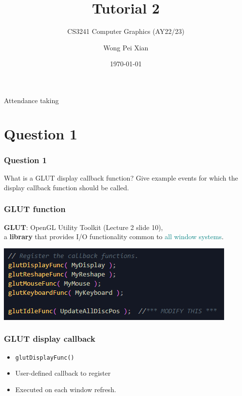 \documentclass{beamer}
\title{Tutorial 2}
\subtitle{CS3241 Computer Graphics (AY22/23)}
\date{\today}
\author{Wong Pei Xian}
\institute[]{\email{e0389023@u.nus.edu}}
\begin{document}
\frame[plain]{\titlepage}

\begin{frame}
    \AlegreyaExtraBold \LARGE
    Attendance taking
\end{frame}

\section{Question 1}

\begin{frame}
    \frametitle{Question 1}
    What is a GLUT display callback function?  
    Give example events for which the display callback function should be called.
\end{frame}

\begin{frame}
    \frametitle{GLUT function}

    \begin{tcolorbox}
        \textbf{GLUT}: OpenGL Utility Toolkit (Lecture 2 slide 10), \\
        
        a \textbf{library} that provides I/O functionality common to \textcolor{teal}{all window systems}.
    \end{tcolorbox}

    \begin{center}
        \includegraphics[]{q1-glut-callbacks.png}
    \end{center}

\end{frame}

\begin{frame}
    \frametitle{GLUT display callback}

    \begin{itemize}
        \item \texttt{glutDisplayFunc()}
        \item User-defined callback to register
        \item Executed on each window refresh.
    \end{itemize}

\end{frame}
\end{document}
